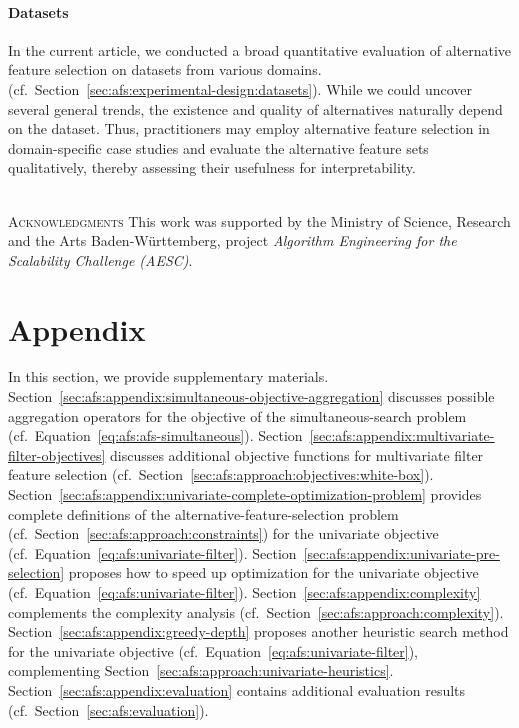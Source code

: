 \documentclass{article}
\theoremstyle{definition}
\begin{document}
\paragraph{Datasets}

In the current article, we conducted a broad quantitative evaluation of alternative feature selection on datasets from various domains. (cf.~Section~\ref{sec:afs:experimental-design:datasets}).
While we could uncover several general trends, the existence and quality of alternatives naturally depend on the dataset.
Thus, practitioners may employ alternative feature selection in domain-specific case studies and evaluate the alternative feature sets qualitatively, thereby assessing their usefulness for interpretability.

~\\
\noindent \textsc{Acknowledgments}\quad
This work was supported by the Ministry of Science, Research and the Arts Baden-Württemberg, project \emph{Algorithm Engineering for the Scalability Challenge (AESC)}.

\appendix

\section{Appendix}
\label{sec:afs:appendix}

In this section, we provide supplementary materials.
Section~\ref{sec:afs:appendix:simultaneous-objective-aggregation} discusses possible aggregation operators for the objective of the simultaneous-search problem (cf.~Equation~\ref{eq:afs:afs-simultaneous}).
Section~\ref{sec:afs:appendix:multivariate-filter-objectives} discusses additional objective functions for multivariate filter feature selection (cf.~Section~\ref{sec:afs:approach:objectives:white-box}).
Section~\ref{sec:afs:appendix:univariate-complete-optimization-problem} provides complete definitions of the alternative-feature-selection problem (cf.~Section~\ref{sec:afs:approach:constraints}) for the univariate objective (cf.~Equation~\ref{eq:afs:univariate-filter}).
Section~\ref{sec:afs:appendix:univariate-pre-selection} proposes how to speed up optimization for the univariate objective (cf.~Equation~\ref{eq:afs:univariate-filter}).
Section~\ref{sec:afs:appendix:complexity} complements the complexity analysis (cf.~Section~\ref{sec:afs:approach:complexity}).
Section~\ref{sec:afs:appendix:greedy-depth} proposes another heuristic search method for the univariate objective (cf.~Equation~\ref{eq:afs:univariate-filter}), complementing Section~\ref{sec:afs:approach:univariate-heuristics}.
Section~\ref{sec:afs:appendix:evaluation} contains additional evaluation results (cf.~Section~\ref{sec:afs:evaluation}).
\end{document}

